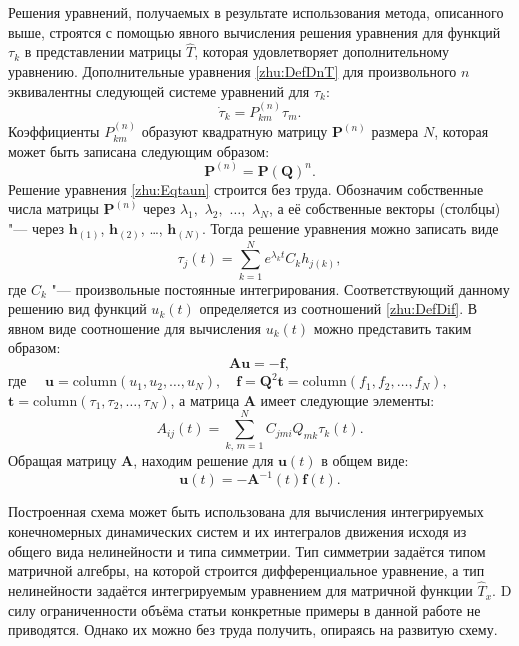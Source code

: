      Решения уравнений, получаемых в результате использования метода, описанного выше, строятся с помощью
    явного вычисления решения уравнения для функций $\tau_k$ в
    представлении матрицы $\hat{T}$, которая удовлетворяет
    дополнительному уравнению. Дополнительные уравнения \eqref{zhu:DefDnT} для
    произвольного $n$ эквивалентны следующей системе уравнений для $\tau_k$:
    \begin{equation}
    \label{zhu:Eqtaun}
    \dot{\tau}_k = P^{(n)}_{km}\tau_m.
    \end{equation}
    Коэффициенты $P^{(n)}_{km}$ образуют квадратную матрицу  $\textbf{P}^{(n)}$ размера $N$, которая может быть записана следующим
    образом:
    $$
         \textbf{P}^{(n)}=\textbf{P}(\textbf{Q})^n.
    $$
    Решение уравнения \eqref{zhu:Eqtaun} строится без труда. Обозначим
    собственные числа матрицы $\textbf{P}^{(n)}$ через
    $\lambda_1,$ $\lambda_2,$ $\ldots,$ $\lambda_N$, а её собственные  векторы (столбцы) "--- через
    $\textbf{h}_{(1)}$, $\textbf{h}_{(2)}$, \dots, $\textbf{h}_{(N)}$. Тогда решение уравнения можно
    записать виде
    $$
        \tau_j(t) = \sum\limits_{k=1}^N e^{\lambda_k t} C_k h_{j(k)},
    $$
    где $C_k$ "--- произвольные постоянные интегрирования.
    Соответствующий данному решению вид функций $u_k(t)$
    определяется из соотношений \eqref{zhu:DefDif}. В явном виде
    соотношение для вычисления $u_k(t)$ можно представить таким
    образом:
    $$
        \textbf{A} \textbf{u} = -  \textbf{f},
    $$
    где $\quad\textbf{u} = \text{column}(u_1, u_2, \ldots, u_N),\quad \textbf{f} = \textbf{Q}^2 \textbf{t} =\text{column}
    (f_1, f_2, \dots, f_N),$ \newline $\textbf{t} =\text{column}
    (\tau_1, \tau_2, \ldots, \tau_N)$, а матрица $\textbf{A}$ имеет
    следующие элементы:
    $$
         A_{ij}(t) = \sum\limits_{k,\,m=1}^N C_{jmi}Q_{mk}\tau_k(t).
    $$
    Обращая матрицу $\textbf{A}$, находим решение для
    $\textbf{u}(t)$ в общем виде:
    $$
         \textbf{u}(t) = -\textbf{A}^{-1}(t)\textbf{f}(t).
    $$
    
\smallskip    

     Построенная схема может быть использована для вычисления
    интегрируемых конечномерных динамических систем и их
    интегралов движения исходя из общего вида нелинейности и типа
    симметрии. Тип симметрии задаётся типом матричной алгебры, на
    которой строится дифференциальное уравнение, а тип
    нелинейности  задаётся интегрируемым уравнением для матричной
    функции $\hat{T}_x$. D силу ограниченности объёма статьи конкретные примеры в
    данной работе не приводятся. Однако их можно без труда
    получить, опираясь на развитую схему.

